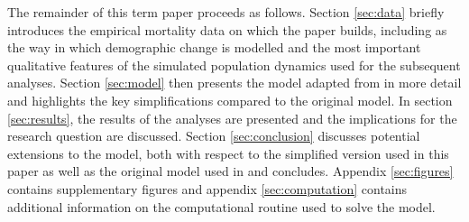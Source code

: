 The remainder of this term paper proceeds as follows. Section \ref{sec:data} briefly introduces the empirical mortality data on which the paper builds, including as the way in which demographic change is modelled and the most important qualitative features of the simulated population dynamics used for the subsequent analyses. Section \ref{sec:model} then presents the model adapted from \cite{LudwigSchelkleVogel2012} in more detail and highlights the key simplifications compared to the original model. In section \ref{sec:results}, the results of the analyses are presented and the implications for the research question are discussed. Section \ref{sec:conclusion} discusses potential extensions to the model, both with respect to the simplified version used in this paper as well as the original model used in \cite{LudwigSchelkleVogel2012} and concludes. Appendix \ref{sec:figures} contains supplementary figures and appendix \ref{sec:computation} contains additional information on the computational routine used to solve the model.

